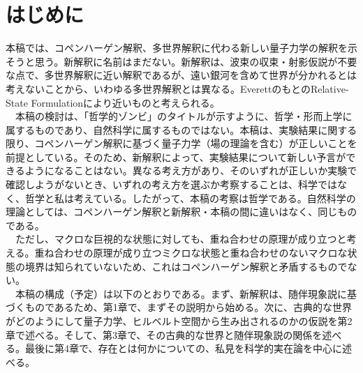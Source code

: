 \section*{はじめに}
本稿では、コペンハーゲン解釈、多世界解釈に代わる新しい量子力学の解釈を示そうと思う。新解釈に名前はまだない。新解釈は、波束の収束・射影仮説が不要な点で、多世界解釈に近い解釈であるが、遠い銀河を含めて世界が分かれるとは考えないことから、いわゆる多世界解釈とは異なる。EverettのもとのRelative-State Formulationにより近いものと考えられる。\\
　本稿の検討は、「哲学的ゾンビ」のタイトルが示すように、哲学・形而上学に属するものであり、自然科学に属するものではない。本稿は、実験結果に関する限り、コペンハーゲン解釈に基づく量子力学（場の理論を含む）が正しいことを前提としている。そのため、新解釈によって、実験結果について新しい予言ができるようになることはない。異なる考え方があり、そのいずれが正しいか実験で確認しようがないとき、いずれの考え方を選ぶか考察することは、科学ではなく、哲学と私は考えている。したがって、本稿の考察は哲学である。自然科学の理論としては、コペンハーゲン解釈と新解釈・本稿の間に違いはなく、同じものである。\\
　ただし、マクロな巨視的な状態に対しても、重ね合わせの原理が成り立つと考える。重ね合わせの原理が成り立つミクロな状態と重ね合わせのないマクロな状態の境界は知られていないため、これはコペンハーゲン解釈と矛盾するものでない。\\
　本稿の構成（予定）は以下のとおりである。まず、新解釈は、随伴現象説に基づくものであるため、第1章で、まずその説明から始める。次に、古典的な世界がどのようにして量子力学、ヒルベルト空間から生み出されるのかの仮説を第2章で述べる。そして、第3章で、その古典的な世界と随伴現象説の関係を述べる。最後に第4章で、存在とは何かについての、私見を科学的実在論を中心に述べる。